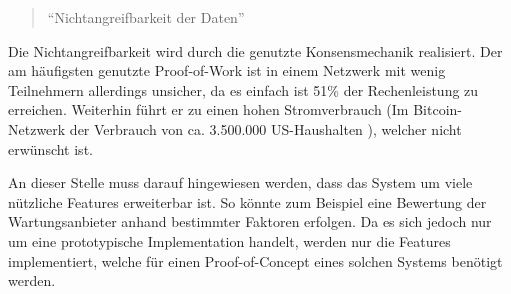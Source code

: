 \begin{quote}
    ``Nichtangreifbarkeit der Daten''
\end{quote}

Die Nichtangreifbarkeit wird durch die genutzte Konsensmechanik realisiert. Der am häufigsten genutzte Proof-of-Work ist in einem Netzwerk mit wenig Teilnehmern allerdings unsicher, da es einfach ist 51\% der Rechenleistung zu erreichen. Weiterhin führt er zu einen hohen Stromverbrauch (Im Bitcoin-Netzwerk der Verbrauch von ca. 3.500.000 US-Haushalten \cite{BitcoinEnergyConsumption}), welcher nicht erwünscht ist.

An dieser Stelle muss darauf hingewiesen werden, dass das System um viele nützliche Features erweiterbar ist. So könnte zum Beispiel eine Bewertung der Wartungsanbieter anhand bestimmter Faktoren erfolgen. Da es sich jedoch nur um eine prototypische Implementation handelt, werden nur die Features implementiert, welche für einen Proof-of-Concept eines solchen Systems benötigt werden.


